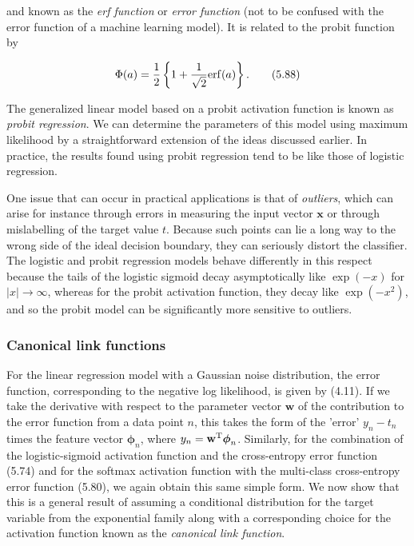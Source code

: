 \documentclass{article}
\begin{document}
and known as the \textit{erf function} or \textit{error function} (not to be confused with the error function of a machine learning model). It is related to the probit function by

\begin{equation}
\Phi(a)=\frac{1}{2}\left\{1+\frac{1}{\sqrt{2}}{\rm erf}(a)\right\}.
\tag{5.88}
\end{equation}

The generalized linear model based on a probit activation function is known as \textit{probit regression}. We can determine the parameters of this model using maximum likelihood by a straightforward extension of the ideas discussed earlier. In practice, the results found using probit regression tend to be like those of logistic regression.

One issue that can occur in practical applications is that of \textit{outliers}, which can arise for instance through errors in measuring the input vector $\mathbf{x}$ or through mislabelling of the target value $t$. Because such points can lie a long way to the wrong side of the ideal decision boundary, they can seriously distort the classifier. The logistic and probit regression models behave differently in this respect because the tails of the logistic sigmoid decay asymptotically like $\exp(-x)$ for $|x|\to\infty$, whereas for the probit activation function, they decay like $\exp(-x^{2})$, and so the probit model can be significantly more sensitive to outliers.

\subsubsection{Canonical link functions}

For the linear regression model with a Gaussian noise distribution, the error function, corresponding to the negative log likelihood, is given by (4.11). If we take the derivative with respect to the parameter vector $\mathbf{w}$ of the contribution to the error function from a data point $n$, this takes the form of the 'error' $y_{n}-t_{n}$ times the feature vector $\boldsymbol{\phi}_{n}$, where $y_{n}=\mathbf{w}^{\rm T}\boldsymbol{\phi}_{n}$. Similarly, for the combination of the logistic-sigmoid activation function and the cross-entropy error function (5.74) and for the softmax activation function with the multi-class cross-entropy error function (5.80), we again obtain this same simple form. We now show that this is a general result of assuming a conditional distribution for the target variable from the exponential family along with a corresponding choice for the activation function known as the \textit{canonical link function}.
\end{document}
